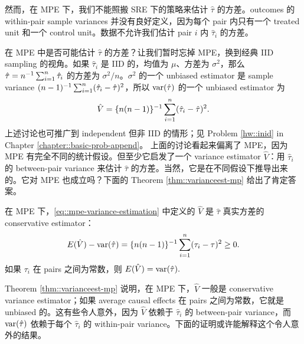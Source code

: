 然而，在 MPE 下，我们不能照搬 SRE 下的策略来估计 $\hat{\tau}  $ 的方差。outcomes 的 within-pair sample variances 并没有良好定义，因为每个 pair 内只有一个 treated unit 和一个 control unit。数据不允许我们估计 pair $i$ 内 $\hat{\tau}_i $ 的方差。


在 MPE 中是否可能估计 $\hat{\tau}$ 的方差？让我们暂时忘掉 MPE，换到经典 IID sampling 的视角。如果 $\hat{\tau}_i$ 是 IID 的，均值为 $\mu$、方差为 $\sigma^2$，那么 $\hat{\tau} = n^{-1} \sum_{i=1}^n \hat{\tau}_i$ 的方差为 $\sigma^2 / n$。$\sigma^2$ 的一个 unbiased estimator 是 sample variance $(n-1)^{-1} \sum_{i=1}^n ( \hat{\tau}_i -  \hat{\tau} )^2$，所以 $\textup{var}( \hat{\tau}  )$ 的一个 unbiased estimator 为
\begin{equation}\label{eq::mpe-variance-estimation}
\hat{V} = \{ n(n-1)  \}^{-1} \sum_{i=1}^n ( \hat{\tau}_i -  \hat{\tau} )^2.
\end{equation}
上述讨论也可推广到 independent 但非 IID 的情形；见 Problem \ref{hw::inid} in Chapter \ref{chapter::basic-prob-append}。
上面的讨论看起来偏离了 MPE，因为 MPE 有完全不同的统计假设。但至少它启发了一个 variance estimator $\hat{V} $：用 $\hat{\tau}_i $ 的 between-pair variance 来估计 $\hat{\tau}  $ 的方差。当然，它是在不同假设下推导出来的。它对 MPE 也成立吗？下面的 Theorem \ref{thm::varianceest-mp} 给出了肯定答案。
 
\begin{theorem}\label{thm::varianceest-mp}
在 MPE 下，\eqref{eq::mpe-variance-estimation} 中定义的 $\hat{V}$ 是 $\hat{\tau}  $ 真实方差的 conservative estimator：
$$
E(  \hat{V}) - \textup{var}(   \hat{\tau}  ) = \{ n(n-1)  \}^{-1} \sum_{i=1}^n  (\tau_i - \tau)^2 \geq 0  .
$$
如果 $\tau_i$ 在 pairs 之间为常数，则 $E(  \hat{V} )  = \textup{var}(\hat{\tau}) .$
\end{theorem}


Theorem \ref{thm::varianceest-mp} 说明，在 MPE 下，$\hat{V} $ 一般是 conservative variance estimator；如果 average causal effects 在 pairs 之间为常数，它就是 unbiased 的。这有些令人意外，因为 $\hat{V} $ 依赖于 $ \hat{\tau}_i $ 的 between-pair variance，而 $ \textup{var}(   \hat{\tau}  ) $ 依赖于每个 $ \hat{\tau}_i $ 的 within-pair variance。下面的证明或许能解释这个令人意外的结果。
 
 


